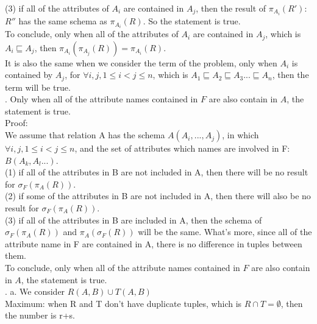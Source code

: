 \documentclass[]{article}
\begin{document}
	(3) if all of the attributes of $A_{i}$ are contained in $A_{j}$, then the result of $\pi_{A_{i}}(R')$: $R''$  has the same schema as $\pi_{A_{i}}(R)$. So the statement is true.\\
	
	\noindent To conclude, only when all of the attributes of $A_{i}$ are contained in $A_{j}$, which is $A_{i}\sqsubseteq A_{j}$, then $\pi_{A_{i}}(\pi_{A_{j}}(R)) = \pi_{A_{i}}(R)$.\\
	
	\noindent It is also the same when we consider the term of the problem, only when $A_{i}$ is contained by $A_{j}$, for $\forall i,j, 1\le i<j\le n$, which is $A_{1}\sqsubseteq A_{2}\sqsubseteq A_{3}...\sqsubseteq A_{n}$, then the term will be true.\\
	
	
	. Only when all of the attribute names contained in $F$ are also contain in $A$, the statement is true.\\
	
	\noindent Proof: \\
	
	\noindent We assume that relation A has the schema $A(A_{i},..., A_{j})$, in which $\forall i,j, 1\le i<j\le n$, and the set of attributes which names are involved in F: $B(A_{k}, A_{l}...)$.\\
	
	(1) if all of the attributes in B are not included in A, then there will be no result for $\sigma_{F}(\pi_{A}(R))$. \\
	
	(2) if some of the attributes in B are not included in A, then there will also be no result for $\sigma_{F}(\pi_{A}(R))$. \\
	
	(3) if all of the attributes in B are included in A, then the schema of $\sigma_{F}(\pi_{A}(R))$ and $\pi_{A}(\sigma_{F}(R))$ will be the same. What's more, since all of the attribute name in F are contained in A, there is no difference in tuples between them.\\
	
	\noindent To conclude, only when all of the attribute names contained in $F$ are also contain in $A$, the statement is true.\\
	
	. a. We consider $R(A, B)\cup T(A, B)$\\
	
	Maximum: when R and T don't have duplicate tuples, which is $R\cap T=\emptyset$, then the number is r+s.\\
	
\end{document}
